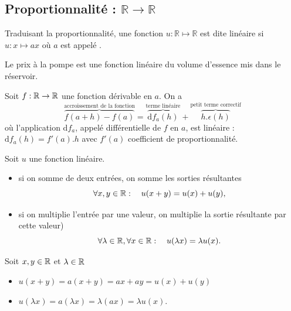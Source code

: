 \documentclass{book}
\begin{document}
\subsection{Proportionnalité : $\mathbb{R}\rightarrow\mathbb{R}$}
\begin{Definition}
Traduisant la proportionnalité, une fonction $u:\mathbb{R}\mapsto\mathbb{R}$ est dite linéaire si  $ u:x\mapsto a x$ où  $a$ est appelé .
\end{Definition}
\begin{Exemple}
Le prix à la pompe est une fonction linéaire du volume d'essence mis dans le réservoir.
\end{Exemple}
\begin{Exemple}[Différentielle]
Soit $f:\mathbb{R} \rightarrow \mathbb{R} $ une fonction dérivable en $a$. On a  
$$\overbrace{f(a+h)-f(a)}^{\text{accroissement de la fonction}}=\overbrace{\mathrm {d}f_a(h)}^{\text{terme linéaire}}+\overbrace{h.\epsilon(h)}^{\text{petit terme correctif}}$$ où l'application $\mathrm {d}f_a$, appelé différentielle de $f$ en $a$, est linéaire : $\mathrm {d}f_a(h)=f'(a).h$ avec $f'(a)$ coefficient de proportionnalité.
\end{Exemple}
\begin{Proposition}
Soit $u$ une fonction linéaire.
\begin{itemize}
\item si on somme de deux entrées, on somme les sorties résultantes
$$\forall   x,y\in  \mathbb{R}:\quad u(x+y) = u(x) + u(y),$$
\item si on multiplie l'entrée par une valeur, on multiplie la sortie résultante par cette valeur)
  $$\forall   \lambda \in  \mathbb{R},\forall   x\in  \mathbb{R} :\quad u(\lambda x) = \lambda u(x).$$
\end{itemize}
\end{Proposition}
\begin{Demonstration}
Soit $x,y\in  \mathbb{R} $ et $\lambda \in  \mathbb{R}$
\begin{itemize}
\item $u(x+y) = a (x+y)=a x+a y =  u(x) + u(y) $ 
\item $u(\lambda x) = a (\lambda x) =\lambda(ax)=\lambda u(x) $.
\end{itemize}
\end{Demonstration}
\end{document}
